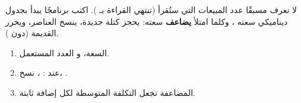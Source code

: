 \clearpage
{}

\begin{statement}
لا نعرف مسبقًا عدد المبيعات التي ستُقرأ (تنتهي القراءة بـ ). اكتب برنامجًا يبدأ بجدول ديناميكي سعته ، وكلما امتلأ \textbf{يضاعف} سعته: يحجز كتلة جديدة، ينسخ العناصر، ويحرر القديمة (دون ).
\end{statement}
\begin{stepsbox}\begin{enumerate}
\item {} السعة، و  العدد المستعمل.
\item عند : ، نسخ، .
\item المضاعفة تجعل التكلفة المتوسطة لكل إضافة ثابتة.
\end{enumerate}\end{stepsbox}
